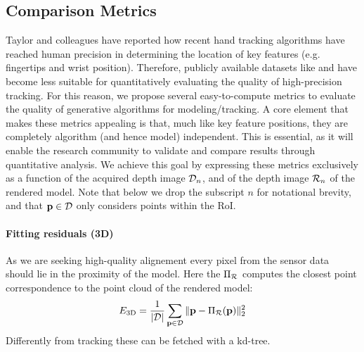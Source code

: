 \subsection{Comparison Metrics}
Taylor and colleagues  have reported how recent hand tracking algorithms \cite{sharp2015accurate} \cite{tagliasacchi2015robust} have reached human precision in determining the location of key features (e.g. fingertips and wrist position). Therefore, publicly available datasets like \cite{tompson2014real} and \cite{sridhar2013multicam}  have become less suitable for quantitatively evaluating the quality of high-precision tracking. 
% 
For this reason, we propose several easy-to-compute metrics to evaluate the quality of generative algorithms for modeling/tracking. A core element that makes these metrics appealing is that, much like key feature positions, they are completely algorithm (and hence model) independent. This is essential, as it will enable the research community to validate and compare results through quantitative analysis. 
% 
We achieve this goal by expressing these metrics exclusively as a function of the acquired depth image $\mathcal{D}_n$, and of the depth image $\mathcal{R}_{n}$ of the rendered model. Note that below we drop the subscript $n$ for notational brevity, and that $\mathbf{p} \in \mathcal{D}$ only considers points within the RoI. 



\paragraph{Fitting residuals (3D)}
As we are seeking high-quality alignement every pixel from the sensor data should lie in the proximity of the model. Here the $\Pi_{\mathcal{R}}$ computes the closest point correspondence to the point cloud of the rendered model:
\begin{equation}
E_\text{3D} = \frac{1}{|\mathcal{D}|}\sum_{\mathbf{p} \in \mathcal{D}} \| \mathbf{p} - \Pi_{\mathcal{R}}(\mathbf{p}) \|_2^2
\label{eq:metric1}
\end{equation}
Differently from tracking these can be fetched with a kd-tree.


